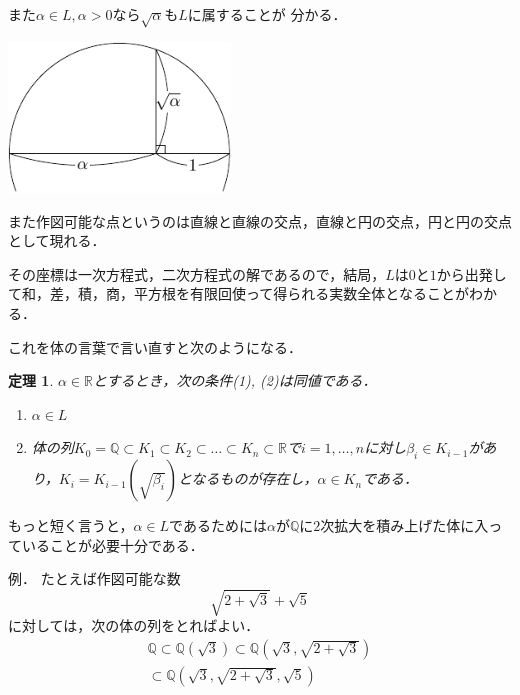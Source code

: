 \documentclass[dvipdfmx,17pt]{beamer}
\theoremstyle{plain}
\newtheorem{thm}{定理}
\newcommand{\Q}{\mathbb{Q}}
\newcommand{\R}{\mathbb{R}}
\begin{document}
\begin{frame}
また$\alpha \in L, \alpha > 0$なら$\sqrt{\alpha}$も$L$に属することが
分かる．

\begin{center}\includegraphics[height=4cm]{sqrt-crop.pdf}\end{center}
\end{frame}

\begin{frame}
また作図可能な点というのは直線と直線の交点，直線と円の交点，円と円の交点として現れる．

その座標は一次方程式，二次方程式の解であるので，結局，$L$は$0$と$1$から出発して和，差，積，商，平方根を有限回使って得られる実数全体となることがわかる．
\end{frame}

\begin{frame}
これを体の言葉で言い直すと次のようになる．

\begin{thm}
$\alpha \in \R$とするとき，次の条件(1), (2)は同値である．
\begin{enumerate}
\item $\alpha \in L$
\item 体の列$K_0 = \Q \subset K_1 \subset K_2 \subset \dots \subset K_n \subset \R$で$i = 1, \dots, n$に対し$\beta_i \in K_{i-1}$があり，$K_i = K_{i-1}(\sqrt{\beta_i})$となるものが存在し，$\alpha \in K_n$である．
\end{enumerate}
\end{thm}
\end{frame}

\begin{frame}
もっと短く言うと，$\alpha \in L$であるためには$\alpha$が$\Q$に$2$次拡大を積み上げた体に入っていることが必要十分である．
\end{frame}

\begin{frame}
例． たとえば作図可能な数
\[ \sqrt{2+\sqrt{3}} + \sqrt{5} \]
に対しては，次の体の列をとればよい．
\begin{align*}
\Q \subset \Q(\sqrt{3}) \subset \Q(\sqrt{3}, \sqrt{2+\sqrt{3}}) \\ 
\subset \Q(\sqrt{3}, \sqrt{2+\sqrt{3}}, \sqrt{5}) \end{align*}


\end{frame}
\end{document}
